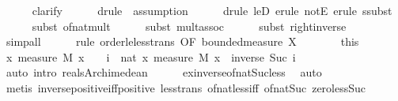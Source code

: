 \documentclass[leqno]{article}
\theoremstyle{definition}
\begin{document}
\begin{isabellebody}
\ \ \ \ \isamarkupfalse%
\ clarify\isanewline
\ \ \ \ \isamarkupfalse%
\ {\isacharparenleft}drule\ {\isacharasterisk}{\isacharcomma}\ assumption{\isacharparenright}\isanewline
\ \ \ \ \isamarkupfalse%
\ {\isacharparenleft}drule\ leD{\isacharcomma}\ erule\ notE{\isacharcomma}\ erule\ ssubst{\isacharparenright}\isanewline
\ \ \ \ \isamarkupfalse%
\ {\isacharparenleft}subst\ of{\isacharunderscore}nat{\isacharunderscore}mult{\isacharparenright}\isanewline
\ \ \ \ \isamarkupfalse%
\ {\isacharparenleft}subst\ mult{\isachardot}assoc{\isacharparenright}\isanewline
\ \ \ \ \isamarkupfalse%
\ {\isacharparenleft}subst\ right{\isacharunderscore}inverse{\isacharparenright}\isanewline
\ \ \ \ \isamarkupfalse%
\ simp{\isacharunderscore}all\isanewline
\ \ \ \ \isamarkupfalse%
\ {\isacharparenleft}rule\ order{\isacharunderscore}le{\isacharunderscore}less{\isacharunderscore}trans\ {\isacharbrackleft}OF\ bounded{\isacharunderscore}measure\ X{\isacharbrackright}{\isacharparenright}\isanewline
\ \ \isacommand{{\isacharbraceright}}\isamarkupfalse%
\ \isamarkupfalse%
\ {\isacharasterisk}{\isacharasterisk}\ {\isacharequal}\ this\isanewline
\ \ \isamarkupfalse%
\ {\isachardoublequoteopen}{\isacharbraceleft}x{\isachardot}\ measure\ M\ {\isacharbraceleft}x{\isacharbraceright}\ {\isachargreater}\ {}{\isacharbraceright}\ {\isacharequal}\ {\isacharparenleft}{\isasymUnion}i\ {\isacharcolon}{\isacharcolon}\ nat{\isachardot}\ {\isacharbraceleft}x{\isachardot}\ measure\ M\ {\isacharbraceleft}x{\isacharbraceright}\ {\isachargreater}\ inverse\ {\isacharparenleft}Suc\ i{\isacharparenright}{\isacharbraceright}{\isacharparenright}{\isachardoublequoteclose}\isanewline
\ \ \ \ \isamarkupfalse%
\ {\isacharparenleft}auto\ intro{\isacharcolon}\ reals{\isacharunderscore}Archimedean{\isacharparenright}\isanewline
\ \ \ \ \isamarkupfalse%
\ ex{\isacharunderscore}inverse{\isacharunderscore}of{\isacharunderscore}nat{\isacharunderscore}Suc{\isacharunderscore}less\ \isamarkupfalse%
\ auto\isanewline
\ \ \ \ \isamarkupfalse%
\ {\isacharparenleft}metis\ inverse{\isacharunderscore}positive{\isacharunderscore}iff{\isacharunderscore}positive\ less{\isacharunderscore}trans\ of{\isacharunderscore}nat{\isacharunderscore}{}{\isacharunderscore}less{\isacharunderscore}iff\ of{\isacharunderscore}nat{\isacharunderscore}Suc\ zero{\isacharunderscore}less{\isacharunderscore}Suc{\isacharparenright}\isanewline

\end{isabellebody}
\end{document}
